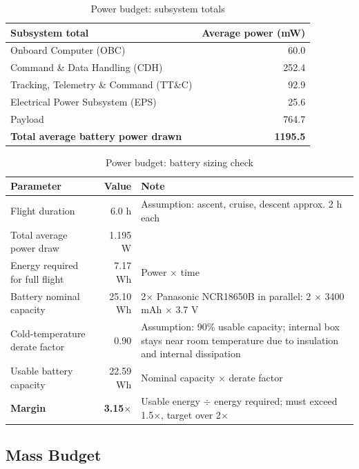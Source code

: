 \begin{table}[H]
\centering
\begin{tabular}{lr}
\toprule
\textbf{Subsystem total} & \textbf{Average power (mW)} \\
\midrule
Onboard Computer (OBC) & 60.0 \\
Command \& Data Handling (CDH) & 252.4 \\
Tracking, Telemetry \& Command (TT\&C) & 92.9 \\
Electrical Power Subsystem (EPS) & 25.6 \\
Payload & 764.7 \\
\midrule
\textbf{Total average battery power drawn} & \textbf{1195.5} \\
\bottomrule
\end{tabular}
\caption{Power budget: subsystem totals}
\end{table}

\begin{table}[H]
\centering
\begin{tabular}{lrp{7cm}}
\toprule
\textbf{Parameter} & \textbf{Value} & \textbf{Note} \\
\midrule
Flight duration & 6.0 h & Assumption: ascent, cruise, descent approx. 2 h each \\
Total average power draw & 1.195 W & \\
Energy required for full flight & 7.17 Wh & Power $\times$ time \\
Battery nominal capacity & 25.10 Wh & 2$\times$ Panasonic NCR18650B in parallel: 2 $\times$ 3400 mAh $\times$ 3.7 V \\
Cold-temperature derate factor & 0.90 & Assumption: 90\% usable capacity; internal box stays near room temperature due to insulation and internal dissipation \\
Usable battery capacity & 22.59 Wh & Nominal capacity $\times$ derate factor \\
\midrule
\textbf{Margin} & \textbf{3.15$\times$} & Usable energy $\div$ energy required; must exceed 1.5$\times$, target over 2$\times$ \\
\bottomrule
\end{tabular}
\caption{Power budget: battery sizing check}
\end{table}

\subsection{Mass Budget}

